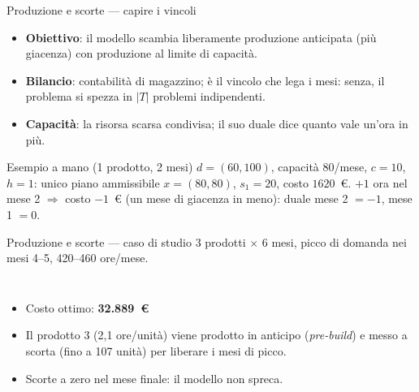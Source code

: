 \documentclass[11pt,aspectratio=169]{beamer}
\begin{document}
\begin{frame}{Produzione e scorte --- capire i vincoli}
\begin{itemize}
  \item \textbf{Obiettivo}: il modello scambia liberamente produzione anticipata
        (più giacenza) con produzione al limite di capacità.
  \item \textbf{Bilancio}: contabilità di magazzino; è il vincolo che \alert{lega i
        mesi}: senza, il problema si spezza in $|T|$ problemi indipendenti.
  \item \textbf{Capacità}: la risorsa scarsa condivisa; il suo duale dice quanto
        vale un'ora in più.
\end{itemize}
\begin{block}{Esempio a mano (1 prodotto, 2 mesi)}
$d = (60, 100)$, capacità $80$/mese, $c = 10$, $h = 1$: unico piano ammissibile
$x = (80, 80)$, $s_1 = 20$, costo $1620$~\euro. $+1$ ora nel mese 2 $\Rightarrow$
costo $-1$~\euro{} (un mese di giacenza in meno): duale mese 2 $= -1$, mese 1 $= 0$.
\end{block}
\end{frame}

\begin{frame}{Produzione e scorte --- caso di studio}
3 prodotti $\times$ 6 mesi, picco di domanda nei mesi 4--5, 420--460 ore/mese.
\begin{columns}
\small
\begin{itemize}
  \item Costo ottimo: \textbf{32.889~\euro}
  \item Il prodotto 3 (2,1 ore/unità) viene prodotto \alert{in anticipo}
        (\emph{pre-build}) e messo a scorta (fino a 107 unità) per liberare i mesi
        di picco.
  \item Scorte a zero nel mese finale: il modello non spreca.
\end{itemize}
\end{columns}
\end{frame}
\end{document}

